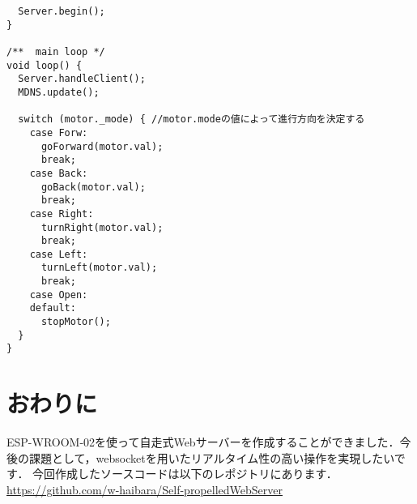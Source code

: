 \begin{verbatim}
  Server.begin();
}

/**  main loop */
void loop() {
  Server.handleClient();
  MDNS.update();

  switch (motor._mode) { //motor.modeの値によって進行方向を決定する
    case Forw:
      goForward(motor.val);
      break;
    case Back:
      goBack(motor.val);
      break;
    case Right:
      turnRight(motor.val);
      break;
    case Left:
      turnLeft(motor.val);
      break;
    case Open:
    default:
      stopMotor();
  }
}
\end{verbatim}

\section{おわりに}
ESP-WROOM-02を使って自走式Webサーバーを作成することができました．今後の課題として，websocketを用いたリアルタイム性の高い操作を実現したいです．
今回作成したソースコードは以下のレポジトリにあります．\url{https://github.com/w-haibara/Self-propelledWebServer}
